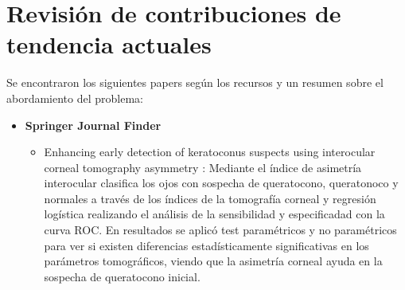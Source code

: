 \section{Revisión de contribuciones de tendencia actuales}
Se encontraron los siguientes papers según los recursos y un resumen sobre el abordamiento del problema:
\begin{itemize}
    \item \textbf{Springer Journal Finder}
    \begin{itemize}
        \item Enhancing early detection of keratoconus suspects using interocular corneal tomography asymmetry \cite{li2025enhancing}: Mediante el índice de asimetría interocular clasifica los ojos con sospecha de queratocono, queratonoco y normales a través de los índices de la tomografía corneal y regresión logística realizando el análisis de la sensibilidad y especificadad con la curva ROC. En resultados se aplicó test paramétricos y no paramétricos para ver si existen diferencias estadísticamente significativas en los parámetros tomográficos, viendo que la asimetría corneal ayuda en la sospecha de queratocono inicial.


\end{itemize}
\end{itemize}
